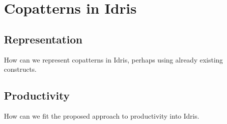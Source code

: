 \section{Copatterns in Idris}
\label{sec:copatterns_in_idris}

\subsection{Representation}
How can we represent copatterns in Idris, perhaps using already existing constructs.

\subsection{Productivity}
How can we fit the proposed approach to productivity into Idris.
